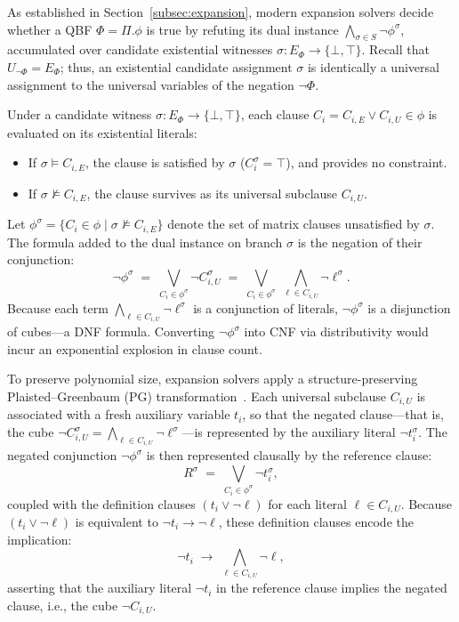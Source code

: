 \documentclass[runningheads]{llncs}
\newcommand{\Bool}{\{\bot,\top\}}
\begin{document}
As established in Section~\ref{subsec:expansion}, modern expansion solvers decide whether a QBF $\Phi = \Pi.\phi$ is true by refuting its dual instance $\bigwedge_{\sigma \in S} \neg\phi^\sigma$, accumulated over candidate existential witnesses $\sigma : E_\Phi \to \Bool$.
Recall that $U_{\neg\Phi} = E_\Phi$; thus, an existential candidate assignment $\sigma$ is identically a universal assignment to the universal variables of the negation $\neg\Phi$.

Under a candidate witness $\sigma : E_\Phi \to \Bool$, each clause $C_i = C_{i,E} \lor C_{i,U} \in \phi$ is evaluated on its existential literals:
\begin{itemize}
    \item If $\sigma \models C_{i,E}$, the clause is satisfied by $\sigma$ ($C_i^\sigma = \top$), and provides no constraint.
    \item If $\sigma \not\models C_{i,E}$, the clause survives as its universal subclause $C_{i,U}$.
\end{itemize}
Let $\phi^\sigma = \{C_i \in \phi \mid \sigma \not\models C_{i,E}\}$ denote the set of matrix clauses unsatisfied by $\sigma$.
The formula added to the dual instance on branch $\sigma$ is the negation of their conjunction:
\begin{equation}
    \neg\phi^\sigma \;=\; \bigvee_{C_i \in \phi^\sigma} \neg C_{i,U}^\sigma
    \;=\; \bigvee_{C_i \in \phi^\sigma} \; \bigwedge_{\ell \in C_{i,U}} \neg\ell^\sigma .
    \label{eq:dual-dnf}
\end{equation}
Because each term $\bigwedge_{\ell \in C_{i,U}} \neg\ell^\sigma$ is a conjunction of literals, $\neg\phi^\sigma$ is a disjunction of cubes---a DNF formula.
Converting $\neg\phi^\sigma$ into CNF via distributivity would incur an exponential explosion in clause count.

To preserve polynomial size, expansion solvers apply a structure-preserving Plaisted--Greenbaum (PG) transformation~\cite{plaistedgreenbaum}.
Each universal subclause $C_{i,U}$ is associated with a fresh auxiliary variable $t_i$, so that the negated clause---that is, the cube $\neg C_{i,U}^\sigma = \bigwedge_{\ell \in C_{i,U}} \neg\ell^\sigma$---is represented by the auxiliary literal $\neg t_i^\sigma$.
The negated conjunction $\neg\phi^\sigma$ is then represented clausally by the reference clause:
\begin{equation}
    R^\sigma \;=\; \bigvee_{C_i \in \phi^\sigma} \neg t_i^\sigma ,
    \label{eq:reference-clause}
\end{equation}
coupled with the definition clauses $(t_i \lor \neg\ell)$ for each literal $\ell \in C_{i,U}$.
Because $(t_i \lor \neg\ell)$ is equivalent to $\neg t_i \to \neg\ell$, these definition clauses encode the implication:
\begin{equation}
    \neg t_i \;\to\; \bigwedge_{\ell \in C_{i,U}} \neg\ell ,
    \label{eq:pg-implication}
\end{equation}
asserting that the auxiliary literal $\neg t_i$ in the reference clause implies the negated clause, i.e., the cube $\neg C_{i,U}$.
\end{document}
